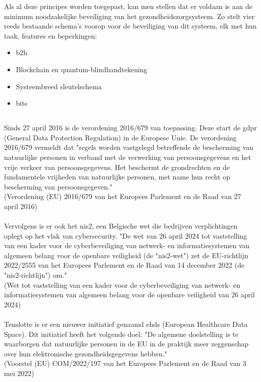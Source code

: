 Als al deze principes worden toegepast, kan men stellen dat er voldaan is aan de minimum noodzakelijke beveiliging van het gezondheidszorgsysteem. Zo stelt \textcite{Wazid2022} vier reeds bestaande schema's voorop voor de beveiliging van dit systeem, elk met hun taak, features en beperkingen:

\begin{itemize}
  \item \gls{b2h} \autocite{Ghosh2022}
  \item Blockchain en quantum-blindhandtekening \autocite{Bhavin2021}
  \item Systeembreed sleutelschema \autocite{Chang2022}
  \item \gls{bits} \autocite{Gupta2020}
\end{itemize}
\subsection{}%
\label{sec:wet}%

Sinds 27 april 2016 is de verordening 2016/679 van toepassing. Deze start de \gls{gdpr} (General Data Protection Regulation) in de Europese Unie. De verordening 2016/679 vermeldt dat "regels worden vastgelegd betreffende de bescherming van natuurlijke personen in verband met de verwerking van persoonsgegevens en het vrije verkeer van persoonsgegevens. Het beschermt de grondrechten en de fundamentele vrijheden van natuurlijke personen, met name hun recht op bescherming van persoonsgegeven."\\ (Verordening (EU) 2016/679 van het Europees Parlement en de Raad van 27 april 2016) %
\\\\
Vervolgens is er ook het \gls{nis2}, een Belgische wet die bedrijven verplichtingen oplegt op het vlak van cybersecurity. "De wet van 26 april 2024 tot vaststelling van een kader voor de cyberbeveiliging van netwerk- en informatiesystemen van algemeen belang voor de openbare veiligheid (de "\gls{nis2}-wet") zet de EU-richtlijn 2022/2555 van het Europees Parlement en de Raad van 14 december 2022 (de "\gls{nis2}-richtlijn") om." \\
(Wet tot vaststelling van een kader voor de cyberbeveiliging van netwerk- en informatiesystemen van algemeen belang voor de openbare veiligheid van 26 april 2024) %
\\\\
Tenslotte is er een nieuwer initiatief genaamd \gls{ehds} (European Healthcare Data Space). Dit initiatief heeft het volgende doel: "De algemene doelstelling is te waarborgen dat natuurlijke personen in de EU in de praktijk meer zeggenschap over hun elektronische gezondheidsgegevens hebben."\\ (Voorstel (EU) COM/2022/197 van het Europees Parlement en de Raad van 3 mei 2022) %
